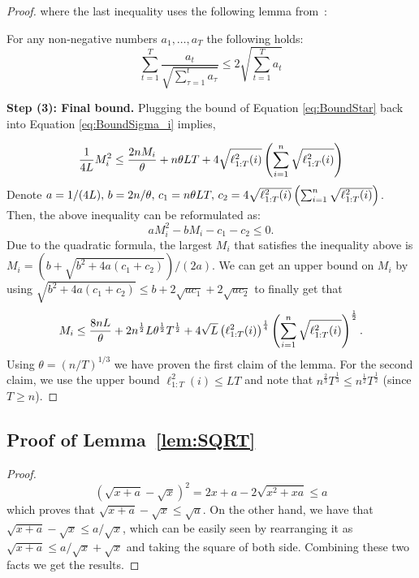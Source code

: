 \begin{proof}
where the last inequality uses the following lemma from~\citep{mcmahan2010adaptive}:
\begin{lemma}{\citep{mcmahan2010adaptive}}\label{lem:SqrtSum}
For any non-negative numbers $a_1,\ldots, a_T$ the following holds:
$$\sum_{t=1}^T \frac{a_t}{\sqrt{\sum_{\tau=1}^t a_\tau}} \leq 2\sqrt{\sum_{t=1}^T a_t}$$
\end{lemma}


\textbf{Step (3): Final bound.}
Plugging the bound of Equation \eqref{eq:BoundStar} back into Equation \eqref{eq:BoundSigma_i} implies,

\begin{align*}
\frac{1}{4L}M_i^2 
 &\leq
\frac{2nM_i}{\theta}
 +
  n  \theta L T
 +
 4 \sqrt{\ell_{1:T}^2(i)}\left( \sum_{i=1}^n \sqrt{\ell_{1:T}^2(i)}\right) \\
\end{align*}
Denote $a=1/(4L), \, b=2n/\theta, \, c_1=n  \theta L T, \, c_2=4 \sqrt{\ell_{1:T}^2(i)}\left( \sum_{i=1}^n \sqrt{\ell_{1:T}^2(i)}\right)$. Then, the above inequality can be reformulated as:
\begin{equation*}
a M_i^2 -b M_i - c_1-c_2 \leq 0.
\end{equation*}
Due to the quadratic formula, the largest $M_i$ that satisfies the inequality above is \linebreak $M_i = \left( b + \sqrt{b^2+4a(c_1+c_2)} \right) / (2a)$. We can get an upper bound on $M_i$ by using \linebreak $\sqrt{b^2+4a(c_1+c_2)} \leq b + 2\sqrt{ac_1}+2\sqrt{ac_2}$ to finally get that
\begin{equation*}
M_i \leq \frac{8nL}{\theta} +2n^{\frac{1}{2}}L \theta ^{\frac{1}{2}} T^{\frac{1}{2}} +  4\sqrt{L}  \left(\ell_{1:T}^2(i)\right) ^{\frac{1}{4}} \left( \sum_{i=1}^n \sqrt{\ell_{1:T}^2(i)}\right)^{\frac{1}{2}}.
\end{equation*}
Using  $\theta =(n/T)^{1/3}$ we have proven the first claim of the lemma. For the second claim, we use the upper bound $\ell_{1:T}^2(i) \leq LT$ and note that $n^{\frac{2}{3}} T^{\frac{1}{3}} \leq n^{\frac{1}{2}} T^{\frac{1}{2}}$ (since $T\geq n$).

\end{proof}

\subsection{Proof of Lemma~\ref{lem:SQRT}} \label{subsec:proof-lem-SQRT}
\begin{proof}
\begin{equation*}
(\sqrt{x+a} - \sqrt{x})^2  
= 2x+a - 2\sqrt{x^2+xa}\leq a
\end{equation*}
which proves that $\sqrt{x+a} - \sqrt{x} \leq \sqrt{a}$. On the other hand, we 
have that $\sqrt{x+a} - \sqrt{x} \leq a/\sqrt{x}$, which can be easily seen by rearranging it as $\sqrt{x+a} \leq a/\sqrt{x} + \sqrt{x} $ and taking the square of both side. Combining these two facts we get the results.
\end{proof}

